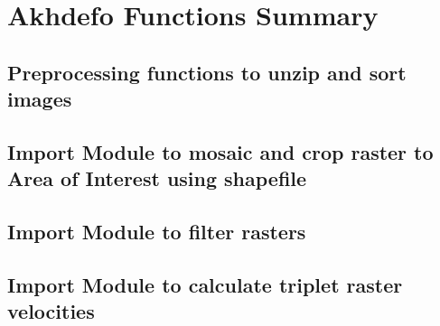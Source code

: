 \documentclass[letterpaper,10pt]{sphinxmanual}
\begin{document}
\chapter{Akhdefo Functions Summary}
\label{\detokenize{README:akhdefo-functions-summary}}

\section{Preprocessing functions to unzip and sort images}
\label{\detokenize{README:preprocessing-functions-to-unzip-and-sort-images}}
\begin{sphinxVerbatim}[commandchars=\\\{\}]
      
\end{sphinxVerbatim}


\section{Import Module to mosaic and crop raster to Area of Interest using shapefile}
\label{\detokenize{README:import-module-to-mosaic-and-crop-raster-to-area-of-interest-using-shapefile}}
\begin{sphinxVerbatim}[commandchars=\\\{\}]
    
\end{sphinxVerbatim}


\section{Import Module to filter rasters}
\label{\detokenize{README:import-module-to-filter-rasters}}
\begin{sphinxVerbatim}[commandchars=\\\{\}]
   
\end{sphinxVerbatim}


\section{Import Module to calculate triplet raster velocities}
\label{\detokenize{README:import-module-to-calculate-triplet-raster-velocities}}
\begin{sphinxVerbatim}[commandchars=\\\{\}]
    
 
\end{sphinxVerbatim}
\end{document}
